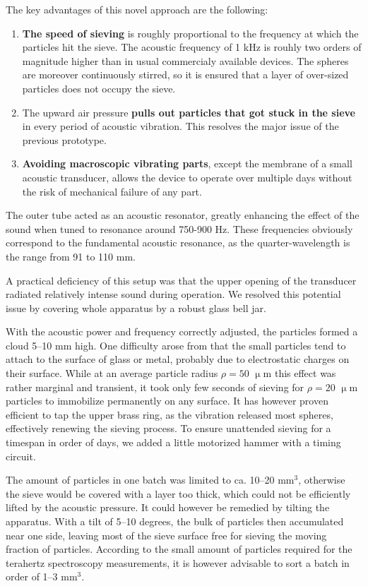 The key advantages of this novel approach are the following:
\begin{enumerate}
 \item{\textbf{The speed of sieving} is roughly proportional to the frequency at which the particles hit the sieve. The acoustic frequency of 1 kHz is rouhly two orders of magnitude higher than in usual commercialy available devices. The spheres are moreover continuously stirred, so it is ensured that a layer of over-sized particles does not occupy the sieve.} 
 \item{The upward air pressure \textbf{pulls out particles that got stuck in the sieve} in every period of acoustic vibration. This resolves the major issue of the previous prototype.} 
 \item{\textbf{Avoiding macroscopic vibrating parts}, except the membrane of a small acoustic transducer, allows the device to operate over multiple days without the risk of mechanical failure of any part.}
 \end{enumerate}


The outer tube acted as an acoustic resonator, greatly enhancing the effect of the sound when tuned to resonance around 750-900 Hz. These frequencies obviously correspond to the fundamental acoustic resonance, as the quarter-wavelength is the range from 91 to 110 mm. 

A practical deficiency of this setup was that the upper opening of the transducer radiated relatively intense sound during operation. We resolved this potential issue by covering whole apparatus by a robust glass bell jar.

With the acoustic power and frequency correctly adjusted, the particles formed a cloud 5--10 mm high. One difficulty arose from that the small particles tend to attach to the surface of glass or metal, probably due to electrostatic charges on their surface. While at an average particle radius $\rho = 50$ $\upmu$m this effect was rather marginal and transient, it took only few seconds of sieving for $\rho = 20$ $\upmu$m particles to immobilize permanently on any surface. It has however proven efficient to tap the upper brass ring, as the vibration released most spheres, effectively renewing the sieving process. To ensure unattended sieving for a timespan in order of days, we added a little motorized hammer with a timing circuit. %

The amount of particles in one batch was limited to ca. 10--20 mm$^{3}$, otherwise the sieve would be covered with a layer too thick, which could not be efficiently lifted by the acoustic pressure.
It could however be remedied by tilting the apparatus. With a tilt of 5--10 degrees, the bulk of particles then accumulated near one side, leaving most of the sieve surface free for sieving the moving fraction of particles. According to the small amount of particles required for the terahertz spectroscopy measurements, it is however advisable to sort a batch in order of 1--3 mm$^{3}$.
